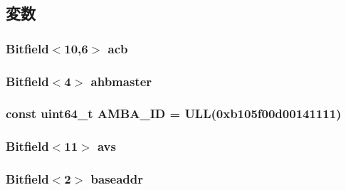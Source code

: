 \subsection{変数}
\hypertarget{classPl111_aec6c41a8f55632082142969f007f3584}{
\subsubsection[{acb}]{\setlength{\rightskip}{0pt plus 5cm}Bitfield$<$10,6$>$ {\bf acb}}}
\label{classPl111_aec6c41a8f55632082142969f007f3584}
\hypertarget{classPl111_a5a24e804d6f5f2b797e631ae3b93577c}{
\subsubsection[{ahbmaster}]{\setlength{\rightskip}{0pt plus 5cm}Bitfield$<$4$>$ {\bf ahbmaster}}}
\label{classPl111_a5a24e804d6f5f2b797e631ae3b93577c}
\hypertarget{classPl111_ae438dff5177bb7a98567cd94061edab4}{
\subsubsection[{AMBA\_\-ID}]{\setlength{\rightskip}{0pt plus 5cm}const uint64\_\-t {\bf AMBA\_\-ID} = ULL(0xb105f00d00141111)}}
\label{classPl111_ae438dff5177bb7a98567cd94061edab4}
\hypertarget{classPl111_abf78b497cfd8378559b939137abed8d5}{
\subsubsection[{avs}]{\setlength{\rightskip}{0pt plus 5cm}Bitfield$<$11$>$ {\bf avs}}}
\label{classPl111_abf78b497cfd8378559b939137abed8d5}
\hypertarget{classPl111_af9a4a8a02ab8754e43bc287b6c2945b6}{
\subsubsection[{baseaddr}]{\setlength{\rightskip}{0pt plus 5cm}Bitfield$<$2$>$ {\bf baseaddr}}}
